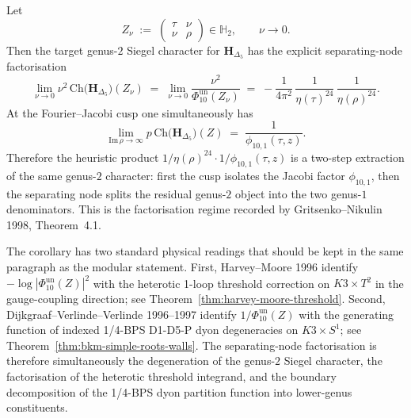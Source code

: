 \begin{corollary}
\label{rem:separating-node-factorisation}
Let
\[
 Z_\nu
 \;:=\;
 \begin{pmatrix}
 \tau & \nu \\
 \nu & \rho
 \end{pmatrix}
 \in \mathbb{H}_2,
 \qquad
 \nu\to 0.
\]
Then the target genus-$2$ Siegel character for $\mathbf{H}_{\Delta_5}$ has the explicit
separating-node factorisation
\[
 \lim_{\nu\to 0}
 \nu^2\,\mathrm{Ch}\bigl(\mathbf{H}_{\Delta_5}\bigr)(Z_\nu)
 \;=\;
 \lim_{\nu\to 0}\frac{\nu^2}{\Phi_{10}^{\mathrm{un}}(Z_\nu)}
 \;=\;
 -\frac{1}{4\pi^2}\,
 \frac{1}{\eta(\tau)^{24}}\,
 \frac{1}{\eta(\rho)^{24}}.
\]
At the Fourier--Jacobi cusp one simultaneously has
\[
 \lim_{\mathrm{Im}\,\rho\to\infty}
 p\,\mathrm{Ch}\bigl(\mathbf{H}_{\Delta_5}\bigr)(Z)
 \;=\;
 \frac{1}{\phi_{10,1}(\tau,z)}.
\]
Therefore the heuristic product
$1/\eta(\rho)^{24}\cdot 1/\phi_{10,1}(\tau,z)$ is a two-step extraction of the same
genus-$2$ character: first the cusp isolates the Jacobi factor $\phi_{10,1}$, then the
separating node splits the residual genus-$2$ object into the two genus-$1$
denominators. This is the factorisation regime recorded by Gritsenko--Nikulin 1998,
Theorem~4.1.
\end{corollary}

\begin{remark}
\label{rem:k3-siegel-character-physics}
The corollary has two standard physical readings that should be kept in the same
paragraph as the modular statement. First, Harvey--Moore 1996 identify
$-\log|\Phi_{10}^{\mathrm{un}}(Z)|^2$ with the heterotic 1-loop threshold correction on
$K3\times T^2$ in the gauge-coupling direction; see
Theorem~\ref{thm:harvey-moore-threshold}. Second, Dijkgraaf--Verlinde--Verlinde
1996--1997 identify $1/\Phi_{10}^{\mathrm{un}}(Z)$ with the generating function of indexed
1/4-BPS D1-D5-P dyon degeneracies on $K3\times S^1$; see
Theorem~\ref{thm:bkm-simple-roots-walls}. The separating-node factorisation is
therefore simultaneously the degeneration of the genus-$2$ Siegel character, the
factorisation of the heterotic threshold integrand, and the boundary decomposition of
the 1/4-BPS dyon partition function into lower-genus constituents.
\end{remark}

